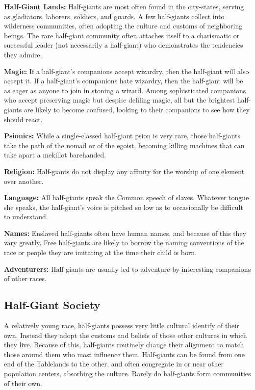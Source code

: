 \textbf{Half-Giant Lands:} Half-giants are most often found in the city-states, serving as gladiators, laborers, soldiers, and guards. A few half-giants collect into wilderness communities, often adopting the culture and customs of neighboring beings. The rare half-giant community often attaches itself to a charismatic or successful leader (not necessarily a half-giant) who demonstrates the tendencies they admire.

\textbf{Magic:} If a half-giant's companions accept wizardry, then the half-giant will also accept it. If a half-giant's companions hate wizardry, then the half-giant will be as eager as anyone to join in stoning a wizard. Among sophisticated companions who accept preserving magic but despise defiling magic, all but the brightest half-giants are likely to become confused, looking to their companions to see how they should react.

\textbf{Psionics:} While a single-classed half-giant psion is very rare, those half-giants take the path of the nomad or of the egoist, becoming killing machines that can take apart a mekillot barehanded.

\textbf{Religion:} Half-giants do not display any affinity for the worship of one element over another.

\textbf{Language:} All half-giants speak the Common speech of slaves. Whatever tongue she speaks, the half-giant's voice is pitched so low as to occasionally be difficult to understand.

\textbf{Names:} Enslaved half-giants often have human names, and because of this they vary greatly. Free half-giants are likely to borrow the naming conventions of the race or people they are imitating at the time their child is born.

\textbf{Adventurers:} Half-giants are usually led to adventure by interesting companions of other races.

\subsection{Half-Giant Society}
A relatively young race, half-giants possess very little cultural identify of their own. Instead they adopt the customs and beliefs of those other cultures in which they live. Because of this, half-giants routinely change their alignment to match those around them who most influence them.
Half-giants can be found from one end of the Tablelands to the other, and often congregate in or near other population centers, absorbing the culture. Rarely do half-giants form communities of their own.

